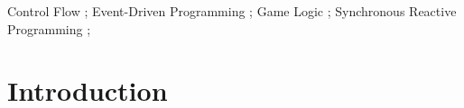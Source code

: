 \documentclass[10pt, conference, compsocconf]{IEEEtran}
\newcommand{\CEU}{\textsc{C\'{e}u}\xspace}
\begin{document}

\maketitle

\begin{abstract}
We present a qualitative case study of rewriting the video game Pingus from C++
to the structured synchronous reactive language \CEU.
%
\CEU supports reactive control-flow primitives that eliminate callbacks and let
programmers write code in direct and sequential style.
Structured reactivity helps describing complex control-flow relationships in
the game logic more concisely.
%
We show gains in productivity for six behaviors in Pingus through a qualitative
analysis of the proposed implementations in \CEU in comparison to the originals
in C++.
%
We also categorize the behaviors in four recurrent control-flow patterns that
likely apply to most games.
\end{abstract}

\begin{IEEEkeywords}
Control Flow                     ;
Event-Driven Programming         ;
Game Logic                       ;
Synchronous Reactive Programming ;
\end{IEEEkeywords}



\section{Introduction}
\end{document}
